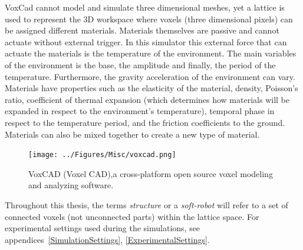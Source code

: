 VoxCad cannot model and simulate three dimensional meshes, yet a lattice is used to represent the 3D workspace where voxels (three dimensional pixels) can be assigned different materials. Materials themselves are passive and cannot actuate without external trigger. In this simulator this external force that can actuate the materials is the temperature of the environment. The main variables of the environment is the base, the amplitude and finally, the period of the temperature. Furthermore, the gravity acceleration of the environment can vary. Materials have properties such as the elasticity of the material, density, Poisson's ratio, coefficient of thermal expansion (which determines how materials will be expanded in respect to the environment's temperature), temporal phase in respect to the temperature period, and the friction coefficients to the ground. Materials can also be mixed together to create a new type of material.

\begin{figure}[t!]
\centering
\texttt{[image: ../Figures/Misc/voxcad.png]}
\caption{VoxCAD (Voxel CAD),a cross-platform open source voxel modeling and analyzing software.}
\label{fig:VoxCAD}
\end{figure}

Throughout this thesis, the terms \textit{structure} or a \textit{soft-robot} will refer to a set of connected voxels (not unconnected parts) within the lattice space. For experimental settings used during the simulations, see appendices~\ref{SimulationSettings}, \ref{ExperimentalSettings}.

